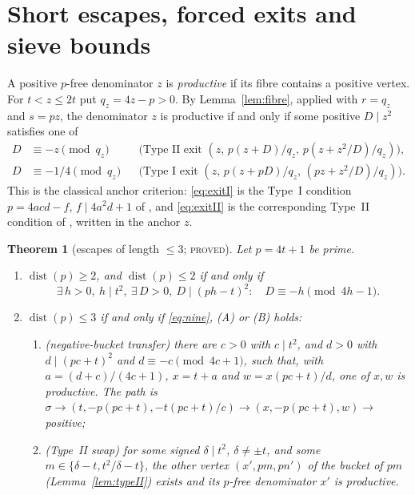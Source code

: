 \documentclass[11pt,reqno]{amsart}
\newtheorem{theorem}{Theorem}[section]
\theoremstyle{definition}
\newcommand{\dist}{\operatorname{dist}}
\newcommand{\status}[1]{\textsc{#1}}
\begin{document}
\section{Short escapes, forced exits and sieve bounds}\label{sec:short}

A positive $p$-free denominator $z$ is \emph{productive} if its fibre
contains a positive vertex.  For $t<z\le2t$ put $q_z=4z-p>0$.  By
Lemma~\ref{lem:fibre}, applied with $r=q_z$ and $s=pz$, the denominator $z$
is productive if and only if some positive $D\mid z^2$ satisfies one of
\begin{align}
 D&\equiv-z\pmod{q_z}&&\text{(Type II exit } (z,\,p(z+D)/q_z,\,p(z+z^2/D)/q_z)),\label{eq:exitII}\\
 D&\equiv-1/4\pmod{q_z}&&\text{(Type I exit } (z,\,p(z+pD)/q_z,\,(pz+z^2/D)/q_z)).\label{eq:exitI}
\end{align}
This is the classical anchor criterion: \eqref{eq:exitI} is the Type~I
condition $p=4acd-f$, $f\mid4a^2d+1$ of \cite[Prop.~2.3]{ET}, and
\eqref{eq:exitII} is the corresponding Type~II condition of
\cite[Prop.~2.7]{ET}, written in the anchor $z$.

\begin{theorem}[escapes of length $\le3$; \status{proved}]\label{thm:depth3}
Let $p=4t+1$ be prime.
\begin{enumerate}
\item $\dist(p)\ge2$, and $\dist(p)\le2$ if and only if
\begin{equation}\label{eq:nine}
 \exists\,h>0,\ h\mid t^2,\ \exists\,D>0,\ D\mid(ph-t)^2:\quad
 D\equiv-h\pmod{4h-1}.
\end{equation}
\item $\dist(p)\le3$ if and only if \eqref{eq:nine}, (A) or (B) holds:
\begin{enumerate}
\item[(A)] \emph{(negative-bucket transfer)} there are $c>0$ with $c\mid t^2$,
and $d>0$ with $d\mid(pc+t)^2$ and $d\equiv-c\pmod{4c+1}$, such that, with
$a=(d+c)/(4c+1)$, $x=t+a$ and $w=x(pc+t)/d$, one of $x,w$ is productive.
The path is
$\sigma\to(t,-p(pc+t),-t(pc+t)/c)\to(x,-p(pc+t),w)\to{}$positive;
\item[(B)] \emph{(Type~II swap)} for some signed $\delta\mid t^2$,
$\delta\ne\pm t$, and some $m\in\{\delta-t,t^2/\delta-t\}$, the other
vertex $(x',pm,pn')$ of the bucket of $pm$ (Lemma~\ref{lem:typeII}) exists
and its $p$-free denominator $x'$ is productive.
\end{enumerate}
\end{enumerate}
\end{theorem}
\end{document}
